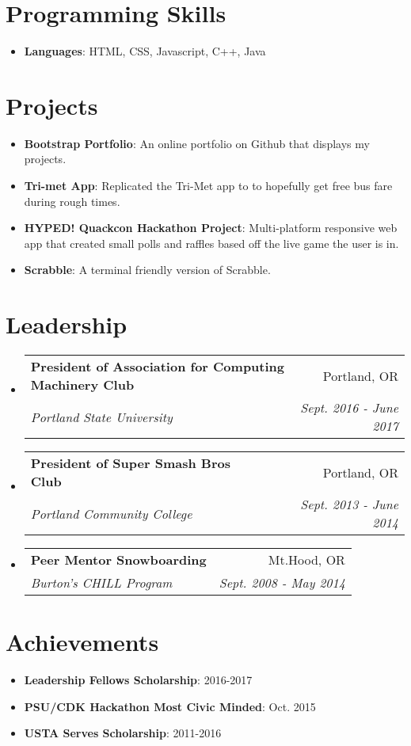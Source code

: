 \documentclass[letterpaper,11pt]{article}
\makeatletter
\newcommand{\resumeItem}[2]{
  \item\small{
    \textbf{#1}{: #2 \vspace{-2pt}}
  }
}
\newcommand{\resumeSubheading}[4]{
  \vspace{-1pt}\item
    \begin{tabular*}{0.97\textwidth}{l@{\extracolsep{\fill}}r}
      \textbf{#1} & #2 \\
      \textit{\small#3} & \textit{\small #4} \\
    \end{tabular*}\vspace{-5pt}
}
\newcommand{\resumeSubItem}[2]{\resumeItem{#1}{#2}\vspace{-4pt}}
\newcommand{\resumeSubHeadingListStart}{\begin{itemize}[leftmargin=*]}
\newcommand{\resumeSubHeadingListEnd}{\end{itemize}}
\makeatother
\begin{document}
\section{Programming Skills}
  \resumeSubHeadingListStart
    \item{
      \textbf{Languages}{: HTML, CSS, Javascript, C++, Java}
    }
  \resumeSubHeadingListEnd

\section{Projects}
  \resumeSubHeadingListStart
    \resumeSubItem{Bootstrap Portfolio}
        {An online portfolio on Github that displays my projects.}
    \resumeSubItem{Tri-met App}
        {Replicated the Tri-Met app to to hopefully get free bus fare during rough times.}
    \resumeSubItem{HYPED! Quackcon Hackathon Project}
         {Multi-platform responsive web app that created small polls and raffles based off the live game the user is in.}
    \resumeSubItem{Scrabble}
        {A terminal friendly version of Scrabble.}
  \resumeSubHeadingListEnd

\section{Leadership}
    \resumeSubHeadingListStart
        \resumeSubheading{President of Association for Computing Machinery Club}{Portland, OR}
        {Portland State University}{Sept. 2016 - June 2017}
    \resumeSubHeadingListEnd
    \resumeSubHeadingListStart
        \resumeSubheading{President of Super Smash Bros Club}{Portland, OR}
        {Portland Community College}{Sept. 2013 - June 2014}
    \resumeSubHeadingListEnd
    \resumeSubHeadingListStart
        \resumeSubheading{Peer Mentor Snowboarding}{Mt.Hood, OR}
        {Burton's CHILL Program}{Sept. 2008 - May 2014}
    \resumeSubHeadingListEnd
    
\section{Achievements}
    \resumeSubHeadingListStart
        \resumeItem{Leadership Fellows Scholarship}{2016-2017}
        \resumeItem{PSU/CDK Hackathon Most Civic Minded}{Oct. 2015}
        \resumeItem{USTA Serves Scholarship}{2011-2016}
    \resumeSubHeadingListEnd
\end{document}
